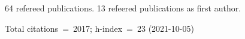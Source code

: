 64 refereed publications. 13 refeered publications as first author.

Total citations~=~2017; h-index~=~23 (2021-10-05)